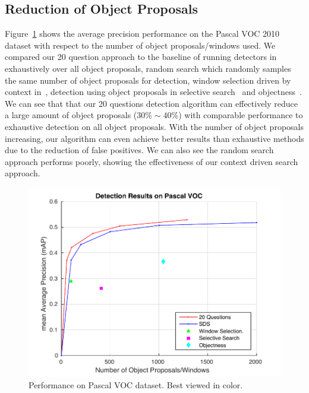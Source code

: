 \subsection{Reduction of Object Proposals} 
Figure~\ref{fig:mapVSnumprop} shows the average precision performance on the Pascal VOC 2010 dataset with respect to the number of object proposals/windows used. We compared our 20 question approach to the baseline of running detectors in~\cite{BharathECCV2014} exhaustively over all object proposals,  random search which randomly samples the same number of object proposals for detection,  window selection driven by context in~\cite{bogdan2012context}, detection using object proposals in selective search~\cite{van2011segmentation} and objectness~\cite{alexe2010object}. We can see that that our 20 questions detection algorithm can effectively reduce a large amount of object proposals ($30\% \sim 40\%$) with comparable performance to exhaustive detection on all object proposals. With the number of object proposals increasing, our algorithm can even achieve better results than exhaustive methods due to the reduction of false positives. We can also see the random search approach performs poorly, showing the effectiveness of our context driven search approach.


\begin{figure}[htb!]
\begin{center}
\includegraphics[width=0.6\linewidth]{figures/numprop.pdf}
\end{center}
\caption{Performance on Pascal VOC dataset. Best viewed in color. }
\label{fig:mapVSnumprop}
\end{figure}

